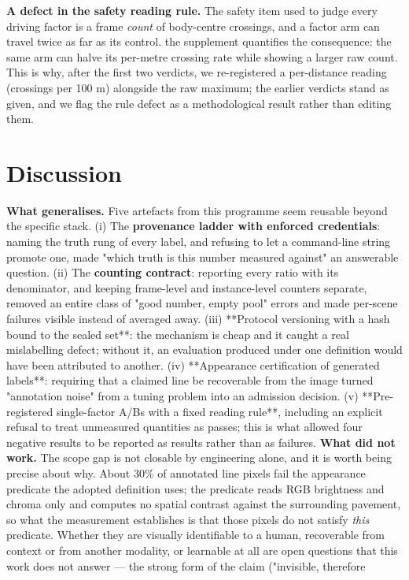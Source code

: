 \documentclass[journal]{IEEEtran}
\begin{document}
\textbf{A defect in the safety reading rule.} The safety item used to judge every driving factor is a frame
\emph{count} of body-centre crossings, and a factor arm can travel twice as far as its control. the supplement
quantifies the consequence: the same arm can halve its per-metre crossing rate while showing a larger
raw count. This is why, after the first two verdicts, we re-registered a per-distance reading
(crossings per 100 m) alongside the raw maximum; the earlier verdicts stand as given, and we flag the
rule defect as a methodological result rather than editing them.
\section{Discussion}
\textbf{What generalises.} Five artefacts from this programme seem reusable beyond the specific stack.
(i) The \textbf{provenance ladder with enforced credentials}: naming the truth rung of every label, and refusing
to let a command-line string promote one, made "which truth is this number measured against" an answerable
question. (ii) The \textbf{counting contract}: reporting every ratio with its denominator, and keeping frame-level
and instance-level counters separate, removed an entire class of "good number, empty pool" errors and made
per-scene failures visible instead of averaged away. (iii) **Protocol versioning with a hash bound to the
sealed set**: the mechanism is cheap and it caught a real mislabelling defect; without it, an evaluation
produced under one definition would have been attributed to another. (iv) **Appearance certification of
generated labels**: requiring that a claimed line be recoverable from the image turned "annotation noise"
from a tuning problem into an admission decision. (v) **Pre-registered single-factor A/Bs with a fixed
reading rule**, including an explicit refusal to treat unmeasured quantities as passes; this is what allowed
four negative results to be reported as results rather than as failures.
\textbf{What did not work.} The scope gap is not closable by engineering alone, and it is worth being precise
about why. About 30\% of annotated line pixels fail the appearance predicate the adopted definition uses;
the predicate reads RGB brightness and chroma only and computes no spatial contrast against the surrounding
pavement, so what the measurement establishes is that those pixels do not satisfy \emph{this} predicate. Whether
they are visually identifiable to a human, recoverable from context or from another modality, or learnable at
all are open questions that this work does not answer --- the strong form of the claim ("invisible, therefore
\end{document}
